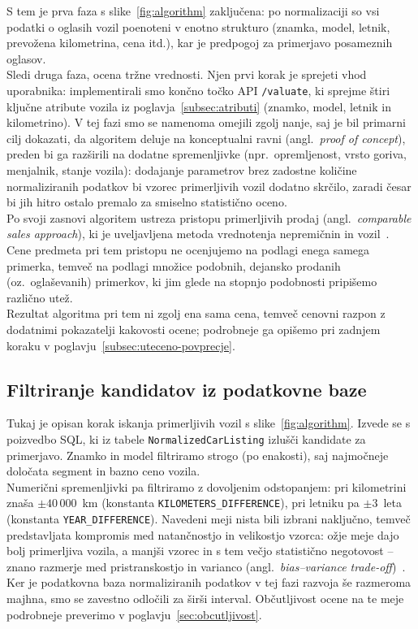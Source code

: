 \documentclass[a4paper,12pt,openright]{book}
\begin{document}
S tem je prva faza s slike~\ref{fig:algorithm} zaključena: po normalizaciji so
vsi podatki o oglasih vozil poenoteni v enotno strukturo (znamka, model, letnik,
prevožena kilometrina, cena itd.), kar je predpogoj za primerjavo posameznih
oglasov.\\
Sledi druga faza, ocena tržne vrednosti. Njen prvi korak je sprejeti vhod uporabnika:
implementirali smo končno točko API \texttt{/valuate}, ki sprejme štiri ključne atribute vozila iz
poglavja~\ref{subsec:atributi} (znamko, model, letnik in kilometrino). V tej fazi smo se namenoma omejili zgolj nanje, saj je bil primarni cilj
dokazati, da algoritem deluje na konceptualni ravni (angl.\ \emph{proof of concept}),
preden bi ga razširili na dodatne spremenljivke (npr.\ opremljenost, vrsto goriva,
menjalnik, stanje vozila): dodajanje parametrov brez zadostne količine normaliziranih
podatkov bi vzorec primerljivih vozil dodatno skrčilo, zaradi česar bi jih hitro
ostalo premalo za smiselno statistično oceno.\\
Po svoji zasnovi algoritem ustreza pristopu primerljivih prodaj (angl.\
\emph{comparable sales approach}), ki je uveljavljena metoda vrednotenja nepremičnin in
vozil~\cite{cma-appraisal}. Cene predmeta pri tem pristopu ne ocenjujemo na
podlagi enega samega primerka, temveč na podlagi množice podobnih, dejansko
prodanih (oz.\ oglaševanih) primerkov, ki jim glede na stopnjo podobnosti
pripišemo različno utež.\\
Rezultat algoritma pri tem ni zgolj ena sama cena, temveč cenovni razpon z
dodatnimi pokazatelji kakovosti ocene; podrobneje ga opišemo pri zadnjem koraku
v poglavju~\ref{subsec:uteceno-povprecje}.

\subsection{Filtriranje kandidatov iz podatkovne baze}
\label{subsec:filtriranje}
Tukaj je opisan korak iskanja primerljivih vozil s slike~\ref{fig:algorithm}.
Izvede se s poizvedbo SQL, ki iz tabele
\texttt{NormalizedCarListing} izlušči kandidate za primerjavo.
Znamko in model filtriramo strogo (po enakosti), saj najmočneje
določata segment in bazno ceno vozila.\\
Numerični spremenljivki pa filtriramo z dovoljenim odstopanjem: pri kilometrini
znaša $\pm 40\,000$~km (konstanta \texttt{KILOMETERS\_DIFFERENCE}), pri letniku
pa $\pm 3$~leta (konstanta \texttt{YEAR\_DIFFERENCE}). Navedeni meji nista bili
izbrani naključno, temveč predstavljata kompromis med natančnostjo in velikostjo
vzorca: ožje meje dajo bolj primerljiva vozila, a manjši vzorec in s tem večjo
statistično negotovost -- znano razmerje med pristranskostjo in varianco
(angl.\ \emph{bias--variance trade-off})~\cite{bias-variance}.
Ker je podatkovna baza normaliziranih podatkov v tej fazi razvoja še razmeroma
majhna, smo se zavestno odločili za širši interval. Občutljivost ocene na te meje
podrobneje preverimo v poglavju~\ref{sec:obcutljivost}.
\end{document}
